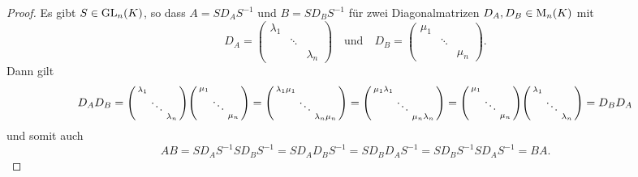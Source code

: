 \begin{proof}
  Es gibt $S \in \operatorname{GL}_{n}(K)$, so dass $A = S D_A S^{-1}$ und $B = S D_B S^{-1}$ für zwei Diagonalmatrizen $D_A, D_B \in \operatorname{M}_{n}(K)$ mit
  \[
      D_A
    = \begin{pmatrix}
        \lambda_1 &         &
        \\
                  & \ddots  &
        \\
                  &         & \lambda_n
      \end{pmatrix}
    \quad\text{und}\quad
      D_B
    = \begin{pmatrix}
        \mu_1 &         &
        \\
              & \ddots  &
        \\
              &         & \mu_n
      \end{pmatrix}.
  \]
  Dann gilt
  \[
      D_A D_B
    = \begin{psmallmatrix}
        \lambda_1 &         &
        \\
                  & \ddots  &
        \\
                  &         & \lambda_n
      \end{psmallmatrix}
      \begin{psmallmatrix}
        \mu_1 &         &
        \\
              & \ddots  &
        \\
              &         & \mu_n
      \end{psmallmatrix}
    = \begin{psmallmatrix}
        \lambda_1 \mu_1 &         &
        \\
                        & \ddots  &
        \\
                        &         & \lambda_n \mu_n
      \end{psmallmatrix}
    = \begin{psmallmatrix}
        \mu_1 \lambda_1 &         &
        \\
                        & \ddots  &
        \\
                        &         & \mu_n \lambda_n
      \end{psmallmatrix}
    = \begin{psmallmatrix}
        \mu_1 &         &
        \\
              & \ddots  &
        \\
              &         & \mu_n
      \end{psmallmatrix}
      \begin{psmallmatrix}
        \lambda_1 &         &
        \\
                  & \ddots  &
        \\
                  &         & \lambda_n
      \end{psmallmatrix}
    = D_B D_A
  \]
  und somit auch
  \[
      A B
    = S D_A S^{-1} S D_B S^{-1}
    = S D_A D_B S^{-1}
    = S D_B D_A S^{-1}
    = S D_B S^{-1} S D_A S^{-1}
    = B A.
  \]
\end{proof}

